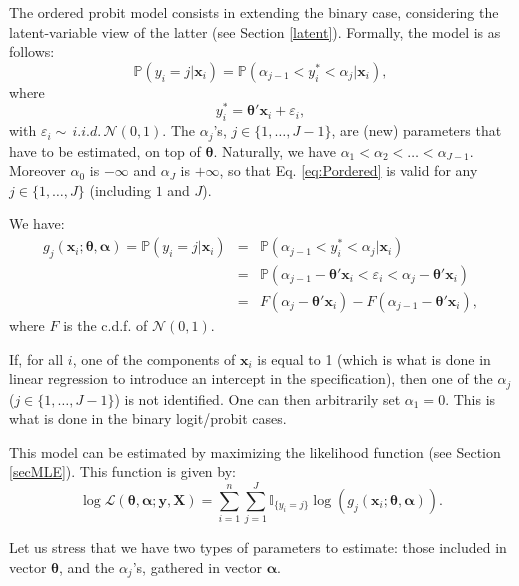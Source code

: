 \documentclass[
  12pt,
]{book}
\theoremstyle{definition}
\theoremstyle{definition}
\theoremstyle{definition}
\theoremstyle{definition}
\theoremstyle{remark}
\begin{document}
The ordered probit model consists in extending the binary case, considering the latent-variable view of the latter (see Section \ref{latent}). Formally, the model is as follows:
\begin{equation}
\mathbb{P}(y_i = j | \mathbf{x}_i) = \mathbb{P}(\alpha_{j-1} <y^*_i < \alpha_{j} |\mathbf{x}_i), \label{eq:Pordered}
\end{equation}
where
\[
y_{i}^* = \boldsymbol\theta'\mathbf{x}_i + \varepsilon_i,
\]
with \(\varepsilon_i \sim \,i.i.d.\,\mathcal{N}(0,1)\). The \(\alpha_j\)'s, \(j \in \{1,\dots,J-1\}\), are (new) parameters that have to be estimated, on top of \(\boldsymbol\theta\). Naturally, we have \(\alpha_1<\alpha_2<\dots<\alpha_{J-1}\). Moreover \(\alpha_0\) is \(- \infty\) and \(\alpha_J\) is \(+ \infty\), so that Eq. \eqref{eq:Pordered} is valid for any \(j \in \{1,\dots,J\}\) (including \(1\) and \(J\)).

We have:
\begin{eqnarray*}
g_j(\mathbf{x}_i;\boldsymbol\theta,\boldsymbol\alpha) = \mathbb{P}(y_i = j | \mathbf{x}_i) &=& \mathbb{P}(\alpha_{j-1} <y^*_i < \alpha_{j} |\mathbf{x}_i) \\
&=& \mathbb{P}(\alpha_{j-1} - \boldsymbol\theta'\mathbf{x}_i  <\varepsilon_i < \alpha_{j} - \boldsymbol\theta'\mathbf{x}_i) \\
&=& F(\alpha_{j} - \boldsymbol\theta'\mathbf{x}_i) - F(\alpha_{j-1} - \boldsymbol\theta'\mathbf{x}_i),
\end{eqnarray*}
where \(F\) is the c.d.f. of \(\mathcal{N}(0,1)\).

If, for all \(i\), one of the components of \(\mathbf{x}_i\) is equal to 1 (which is what is done in linear regression to introduce an intercept in the specification), then one of the \(\alpha_j\) (\(j\in\{1,\dots,J-1\}\)) is not identified. One can then arbitrarily set \(\alpha_1=0\). This is what is done in the binary logit/probit cases.

This model can be estimated by maximizing the likelihood function (see Section \ref{secMLE}). This function is given by:
\begin{equation}
\log \mathcal{L}(\boldsymbol\theta,\boldsymbol\alpha;\mathbf{y},\mathbf{X}) = \sum_{i=1}^n  \sum_{j=1}^J \mathbb{I}_{\{y_i=j\}} \log \left(g_j(\mathbf{x}_i;\boldsymbol\theta,\boldsymbol\alpha)\right). \label{eq:multipleLogLik}
\end{equation}

Let us stress that we have two types of parameters to estimate: those included in vector \(\boldsymbol\theta\), and the \(\alpha_j\)'s, gathered in vector \(\boldsymbol\alpha\).
\end{document}

